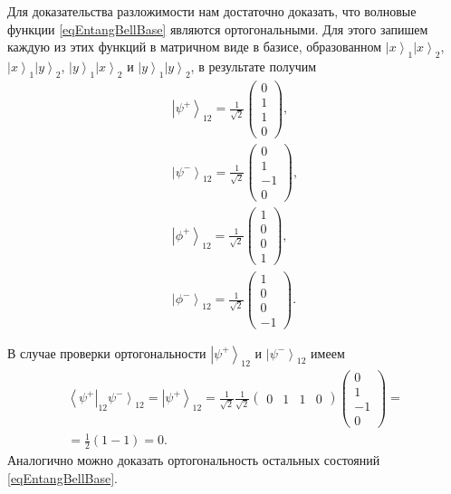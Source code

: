 Для доказательства разложимости нам достаточно доказать, что волновые
функции \eqref{eqEntangBellBase} являются ортогональными. Для этого
запишем каждую из этих функций в матричном виде в базисе, образованном
$\left|x\right>_1\left|x\right>_2$, $\left|x\right>_1\left|y\right>_2$,
$\left|y\right>_1\left|x\right>_2$ и
$\left|y\right>_1\left|y\right>_2$, в результате получим 
\begin{eqnarray}
  \left|\psi^{+}\right>_{12} = 
  \frac{1}{\sqrt{2}}
  \left(
  \begin{array}{c}
    0 \\
    1 \\
    1 \\
    0
  \end{array}
  \right),
  \nonumber \\
  \left|\psi^{-}\right>_{12} = 
  \frac{1}{\sqrt{2}}
  \left(
  \begin{array}{c}
    0 \\
    1 \\
    -1 \\
    0
  \end{array}
  \right),
  \nonumber \\
  \left|\phi^{+}\right>_{12} = 
  \frac{1}{\sqrt{2}}
  \left(
  \begin{array}{c}
    1 \\
    0 \\
    0 \\
    1
  \end{array}
  \right),
  \nonumber \\
  \left|\phi^{-}\right>_{12} = 
  \frac{1}{\sqrt{2}}
  \left(
  \begin{array}{c}
    1 \\
    0 \\
    0 \\
    -1
  \end{array}
  \right).
  \label{eqEntangBellBaseMatrix}
\end{eqnarray}

В случае проверки ортогональности $\left|\psi^{+}\right>_{12}$ и 
$\left|\psi^{-}\right>_{12}$ имеем
\begin{eqnarray}
\left<\psi^{+}\right|_{12}\left.\psi^{-}\right>_{12} = 
  \left|\psi^{+}\right>_{12} = 
  \frac{1}{\sqrt{2}} \frac{1}{\sqrt{2}}
  \left(
  \begin{array}{cccc}
    0 & 1 & 1 & 0
  \end{array}
  \right)   
  \left(
  \begin{array}{c}
    0 \\
    1 \\
    -1 \\
    0
  \end{array}
  \right) = 
\nonumber \\
=
  \frac{1}{2}\left(1 - 1\right) = 0.
\nonumber 
\end{eqnarray}
Аналогично можно доказать ортогональность остальных состояний
\eqref{eqEntangBellBase}. 

